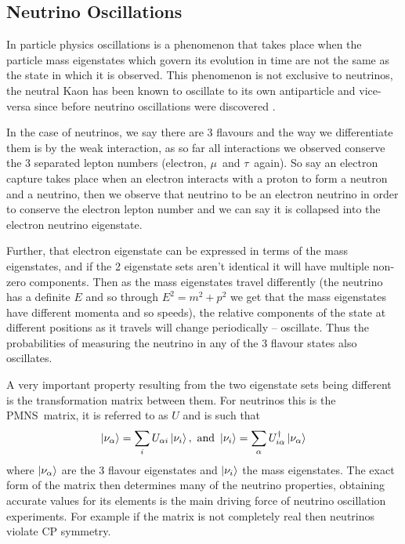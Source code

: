 \documentclass[a4paper,12pt]{article}
\newcommand{\Mu}{$\mu$}
\newcommand{\Tau}{$\tau$}
\begin{document}
\subsection{Neutrino Oscillations}
In particle physics oscillations is a phenomenon that takes place when the particle mass eigenstates which govern its evolution in time are not the same as the state in which it is observed.
This phenomenon is not exclusive to neutrinos, the neutral Kaon has been known to oscillate to its own antiparticle and vice-versa since before neutrino oscillations were discovered \cite{burkhardtWavelengthNeutrinoNeutral2003}.

In the case of neutrinos, we say there are 3 flavours and the way we differentiate them is by the weak interaction, as so far all interactions we observed conserve the 3 separated lepton numbers (electron, \Mu\ and \Tau\ again).
So say an electron capture takes place when an electron interacts with a proton to form a neutron and a neutrino, then we observe that neutrino to be an electron neutrino in order to conserve the electron lepton number and we can say it is collapsed into the electron neutrino eigenstate.

Further, that electron eigenstate can be expressed in terms of the mass eigenstates, and if the 2 eigenstate sets aren't identical it will have multiple non-zero components.
Then as the mass eigenstates travel differently (the neutrino has a definite $E$ and so through $E^2 = m^2 + p^2$ we get that the mass eigenstates have different momenta and so speeds), the relative components of the state at different positions as it travels will change periodically -- oscillate.
Thus the probabilities of measuring the neutrino in any of the 3 flavour states also oscillates.

A very important property resulting from the two eigenstate sets being different is the transformation matrix between them.
For neutrinos this is the PMNS\footnotemark\ matrix, it is referred to as $U$ and is such that 
\begin{equation}
    \ket{\nu_\alpha} = \sum_i U_{\alpha i} \ket{\nu_i}, \text{ and }
    \ket{\nu_i} = \sum_\alpha U^\dag_{i \alpha} \ket{\nu_\alpha}
\end{equation}
where $\ket{\nu_\alpha}$ are the 3 flavour eigenstates and $\ket{\nu_i}$ the mass eigenstates.
The exact form of the matrix then determines many of the neutrino properties, obtaining accurate values for its elements is the main driving force of neutrino oscillation experiments.
For example if the matrix is not completely real then neutrinos violate CP symmetry.
\end{document}
